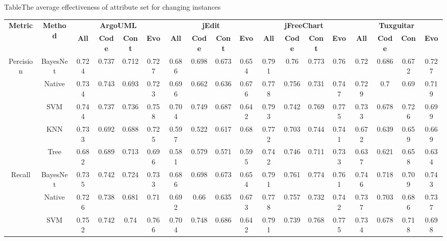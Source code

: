 \begin{sidewaystable} [htbp]
\footnotesize
{}
{Table$\!$}{The average effectiveness of attribute set for changing instances}
\vspace{0.5em}
\centering
\begin{tabular}{cccccccccccccccccc}
\toprule[1.5pt]
\multirow{2}{*}{\textbf{Metric}}&\multirow{2}{*}{\textbf{Method}}&\multicolumn{4}{c}{\textbf{ArgoUML}}&\multicolumn{4}{c}{\textbf{jEdit}}&\multicolumn{4}{c}{\textbf{jFreeChart}}&\multicolumn{4}{c}{\textbf{Tuxguitar}}\\
\cline{3-18}
&&\textbf{All}&\textbf{Code}&\textbf{Cont}&\textbf{Evo}&\textbf{All}&\textbf{Code}&\textbf{Cont}&\textbf{Evo}&\textbf{All}&\textbf{Code}&\textbf{Cont}&\textbf{Evo}&\textbf{All}&\textbf{Code}&\textbf{Con}&\textbf{Evo}~\\
\midrule[1pt]
\multirow{5}{*}{Percision}
&BayesNet&	0.724&	0.737&	0.712&	0.727&		0.686&	0.698&	0.673&	0.654&	0.791&	0.76&	0.773&	0.76&		0.72&	0.686&	0.672&	0.727\\
&Native&	0.734&	0.743&	0.693&	0.723&		0.696&	0.662&	0.636&	0.676&	0.778&	0.756&	0.731&	0.747&		0.729&	0.7	&0.69&	0.719\\
&SVM&	0.744&	0.737&	0.736&	0.758&		0.704&	0.749&	0.687&	0.642&		0.793&	0.742&	0.769&	0.775&		0.733&	0.678&	0.726&	0.699\\
&KNN&	0.733&	0.692&	0.688&	0.725&		0.597&	0.522&	0.617&	0.68&		0.772&	0.703&	0.744&	0.741&		0.672&	0.639&	0.659&	0.669\\
&Tree&	0.682&	0.689&	0.713&	0.696&		0.581&	0.579&	0.571&	0.595&		0.742&	0.746&	0.711&	0.733&		0.637&	0.621&	0.658&	0.634\\
\hline
\multirow{5}{*}{Recall}
&BayesNet&	0.735&	0.742&	0.724&	0.733&		0.686&	0.698&	0.673&	0.654&	0.791&	0.761&	0.774&	0.761&		0.746&	0.718&	0.709&	0.743\\
&Native&	0.726&	0.738&	0.681&	0.71&		0.692&	0.66&	0.635&	0.673&		0.778&	0.757&	0.732&	0.742&		0.737&	0.703&	0.686&	0.737\\
&SVM&	0.752&	0.742&	0.74&	0.766&		0.704&	0.748&	0.686&	0.642&		0.791&	0.739&	0.768&	0.775&		0.734&	0.678&	0.718&	0.698\\

\end{tabular}
\end{sidewaystable}
